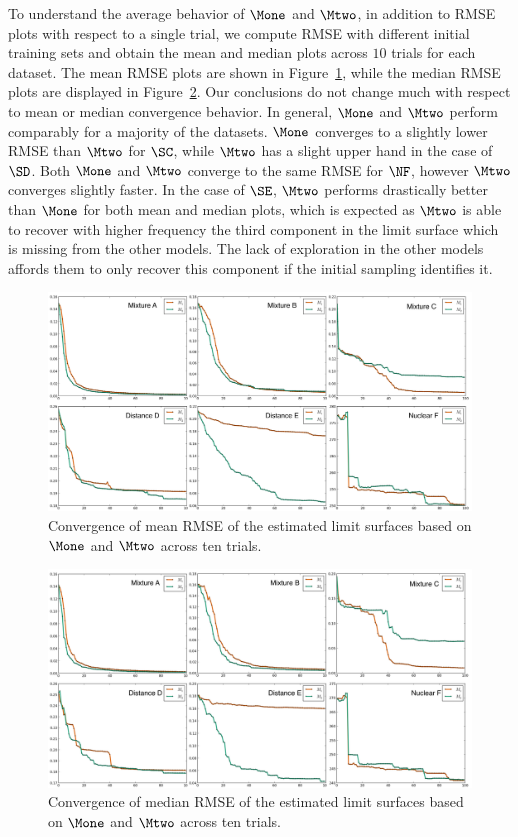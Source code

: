 To understand the average behavior of $\Mone$ and $\Mtwo$, in addition to RMSE plots with respect to a single trial, we compute RMSE with different initial training sets and obtain the mean and median plots across $10$ trials for each dataset.
%
The mean RMSE plots are shown in Figure~\ref{fig:RMSE-mean}, while the median RMSE plots are displayed in Figure~\ref{fig:RMSE-median}.
%
Our conclusions do not change much with respect to mean or median convergence behavior.
%
In general, $\Mone$ and $\Mtwo$ perform comparably for a majority of the datasets.
%
$\Mone$ converges to a slightly lower RMSE than $\Mtwo$ for $\SC$, while $\Mtwo$ has a slight upper hand in the case of $\SD$.
%
Both $\Mone$ and $\Mtwo$ converge to the same RMSE for $\NF$, however $\Mtwo$ converges slightly faster.
%
In the case of $\SE$, $\Mtwo$ performs drastically better than $\Mone$ for both mean and median plots, which is expected as $\Mtwo$ is able to recover with higher frequency the third component in the limit surface which is missing from the other models.
%
The lack of exploration in the other models affords them to only recover this component if the initial sampling identifies it.


\begin{figure}[!ht]
\centering
\includegraphics[width=1.0\textwidth]{figs/chap5/RMSE-mean.pdf}
\caption{Convergence of mean RMSE of the estimated limit surfaces based on $\protect\Mone$ and $\protect\Mtwo$ across ten trials.}
\label{fig:RMSE-mean}
\end{figure}

\begin{figure}[!ht]
\centering
\includegraphics[width=1.0\textwidth]{figs/chap5/RMSE-median.pdf}
\caption{Convergence of median RMSE of the estimated limit surfaces based on $\protect\Mone$ and $\protect\Mtwo$ across ten trials.}
\label{fig:RMSE-median}
\end{figure}

